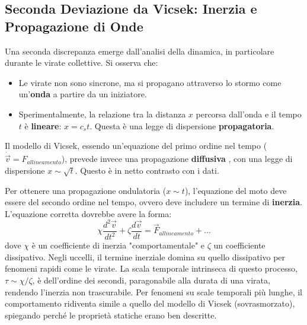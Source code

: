 \subsection{Seconda Deviazione da Vicsek: Inerzia e Propagazione di Onde}
Una seconda discrepanza emerge dall'analisi della dinamica, in particolare durante le virate collettive. Si osserva che:
\begin{itemize}
    \item Le virate non sono sincrone, ma si propagano attraverso lo stormo come un'\textbf{onda} a partire da un iniziatore.
    \item Sperimentalmente, la relazione tra la distanza $x$ percorsa dall'onda e il tempo $t$ è \textbf{lineare}: $x = c_s t$. Questa è una legge di dispersione \textbf{propagatoria}.
\end{itemize}
Il modello di Vicsek, essendo un'equazione del primo ordine nel tempo ($\dot{\vec{v}} = F_{allineamento}$), prevede invece una propagazione \textbf{diffusiva} , con una legge di dispersione $x \sim \sqrt{t}$. Questo è in netto contrasto con i dati.

Per ottenere una propagazione ondulatoria ($x \sim t$), l'equazione del moto deve essere del secondo ordine nel tempo, ovvero deve includere un termine di \textbf{inerzia}. L'equazione corretta dovrebbe avere la forma:
\begin{equation}
    \chi \frac{d^2\vec{v}}{dt^2} + \zeta \frac{d\vec{v}}{dt} = \vec{F}_{allineamento} + \dots
\end{equation}
dove $\chi$ è un coefficiente di inerzia "comportamentale" e $\zeta$ un coefficiente dissipativo. Negli uccelli, il termine inerziale domina su quello dissipativo per fenomeni rapidi come le virate. La scala temporale intrinseca di questo processo, $\tau \sim \chi/\zeta$, è dell'ordine dei secondi, paragonabile alla durata di una virata, rendendo l'inerzia non trascurabile. Per fenomeni su scale temporali più lunghe, il comportamento ridiventa simile a quello del modello di Vicsek (sovrasmorzato), spiegando perché le proprietà statiche erano ben descritte.

